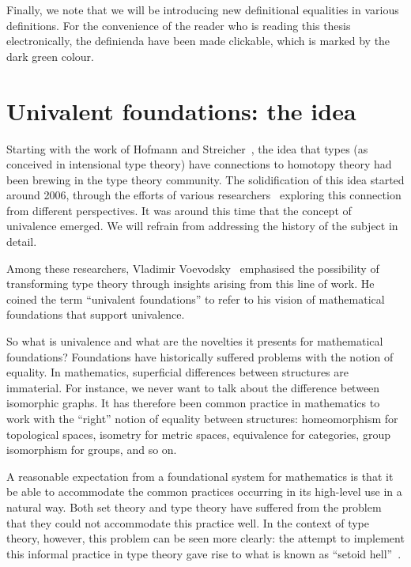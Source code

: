 Finally, we note that we will be introducing new definitional equalities in various
definitions. For the convenience of the reader who is reading this thesis electronically,
the definienda have been made clickable, which is marked by the
{\color{darkgreen} dark green} colour.

\section{Univalent foundations: the idea}

Starting with the work of Hofmann and Streicher~\cite{hofmann-streicher}, the idea that
types (as conceived in intensional type theory) have connections to homotopy theory had
been brewing in the type theory community. The solidification of this idea started around
2006, through the efforts of various researchers~\cite{warren-fmcs, uppsala-awodey, uppsala-garner, uppsala-van-den-berg, voevodsky-very-short}
exploring this connection from different perspectives. It was around this time that the
concept of univalence emerged. We will refrain from addressing the history of the subject
in detail.

Among these researchers, Vladimir Voevodsky~\cite{voevodsky-bernays} emphasised the
possibility of transforming type theory through insights arising from this line of work.
He coined the term ``univalent foundations'' to refer to his vision of mathematical
foundations that support univalence.

So what is univalence and what are the novelties it presents for mathematical foundations?
Foundations have historically suffered problems with the notion of equality. In
mathematics, superficial differences between structures are immaterial. For instance, we
never want to talk about the difference between isomorphic graphs. It has therefore been
common practice in mathematics to work with the ``right'' notion of equality between
structures: homeomorphism for topological spaces, isometry for metric spaces, equivalence
for categories, group isomorphism for groups, and so on.

A reasonable expectation from a foundational system for mathematics is that it be able to
accommodate the common practices occurring in its high-level use in a natural way. Both
set theory and type theory have suffered from the problem that they could not accommodate
this practice well. In the context of type theory, however, this problem can be seen more
clearly: the attempt to implement this informal practice in type theory gave rise to what
is known as ``setoid hell''~\cite{homotopy-heaven}.

